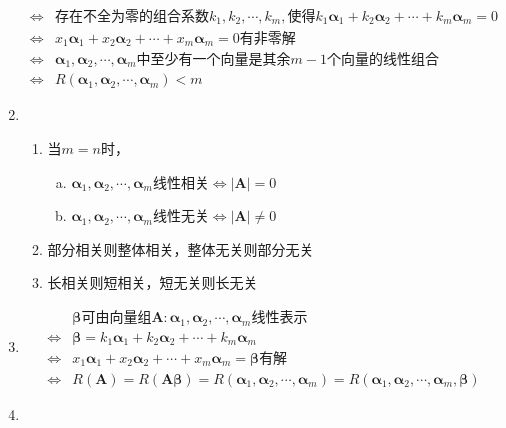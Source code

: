 \documentclass[12pt]{book}
\begin{document}
\begin{enumerate}[1.]
\begin{align*}
              \Leftrightarrow & \text{存在不全为零的组合系数}k_1,k_2,\cdots,k_m,\text{使得} k_1\bm{\alpha}_1+k_2\bm{\alpha}_2+\cdots+k_m\bm{\alpha}_m=0 \\
              \Leftrightarrow & x_1\bm{\alpha}_1+x_2\bm{\alpha}_2+\cdots+x_m\bm{\alpha}_m=0\text{有非零解}                                              \\
              \Leftrightarrow & \bm{\alpha}_1,\bm{\alpha}_2,\cdots,\bm{\alpha}_{m}\text{中至少有一个向量是其余}m-1\text{个向量的线性组合}                      \\
              \Leftrightarrow & R(\bm{\alpha}_1,\bm{\alpha}_2,\cdots,\bm{\alpha}_{m})<m
          \end{align*}
    \item
          \begin{enumerate}[(1)]
              \item 当$m=n$时，
                    \begin{enumerate}[a.]
                        \item $\bm{\alpha}_1,\bm{\alpha}_2,\cdots,\bm{\alpha}_{m}$线性相关$\Leftrightarrow |\bm{A}|=0$
                        \item $\bm{\alpha}_1,\bm{\alpha}_2,\cdots,\bm{\alpha}_{m}$线性无关$\Leftrightarrow |\bm{A}|\neq 0$
                    \end{enumerate}
              \item 部分相关则整体相关，整体无关则部分无关
              \item 长相关则短相关，短无关则长无关
          \end{enumerate}
    \item
          \begin{align*}
                              & \bm{\beta}\text{可由}\text{向量组}\bm{A}:\bm{\alpha}_1,\bm{\alpha}_2,\cdots,\bm{\alpha}_m\text{线性表示} \\
              \Leftrightarrow & \bm{\beta} = k_1\bm{\alpha}_1+k_2\bm{\alpha}_2+\cdots+k_m\bm{\alpha}_m                                        \\
              \Leftrightarrow & x_1\bm{\alpha}_1+x_2\bm{\alpha}_2+\cdots+x_m\bm{\alpha}_m=\bm{\beta}\text{有解}                               \\
              \Leftrightarrow & R(\bm{A}) = R(\bm{A \beta})=R(\bm{\alpha}_1,\bm{\alpha}_2,\cdots,\bm{\alpha}_{m})=R(\bm{\alpha}_1,\bm{\alpha}_2,\cdots,\bm{\alpha}_{m},\bm{\beta}) 
          \end{align*}
    \item

\end{enumerate}
\end{document}
